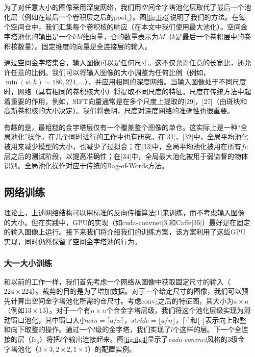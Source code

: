\documentclass[../main.tex]{subfile}
\begin{document}
为了对任意大小的图像采用深度网络，我们用空间金字塔池化层取代了最后一个池化层（例如在最后一个卷积层之后的$\text{pool}_5$）。图\ref{fig:fig3}说明了我们的方法。在每个空间仓中，我们汇集每个卷积核的响应（在本文中我们使用最大池化）。空间金字塔池化的输出是一个$kM$维向量，仓的数量表示为$M$（$k$是最后一个卷积层中的卷积核数量）。固定维度的向量是全连接层的输入。

通过空间金字塔集合，输入图像可以是任何尺寸。这不仅允许任意的长宽比，还允许任意的比例。我们可以将输入图像的大小调整为任何比例（例如，$\min\left(w, h\right) = 180,224,\ldots$），并应用相同的深度网络。当输入图像处于不同尺度时，网络（具有相同的卷积核大小）将提取不同尺度的特征。尺度在传统方法中起着重要的作用，例如，SIFT向量通常是在多个尺度上提取的[29]，[27]（由斑块和高斯卷积核的大小决定）。我们将表明，尺度对深度网络的准确性也很重要。

有趣的是，最粗糙的金字塔层仅有一个覆盖整个图像的单仓。这实际上是一种“全局池化”操作，在几个同时进行的工作中也有研究。在[31]、[32]中，全局平均池化被用来减少模型的大小，也减少了过拟合；在[33]中，全局平均池化被用在所有$fc$层之后的测试阶段，以提高准确性；在[34]中，全局最大池化被用于弱监督的物体识别。全局池化操作对应于传统的Bag-of-Words方法。

\subsection{网络训练}

理论上，上述网络结构可以用标准的反向传播算法[1]来训练，而不考虑输入图像的大小。但在实践中，GPU的实现（如cuda-convnet[3]和Caffe[35]）最好是在固定的输入图像上运行。接下来我们将介绍我们的训练方案，该方案利用了这些GPU实现，同时仍然保留了空间金字塔池的行为。

\subsubsection*{大一大小训练}

和以前的工作一样，我们首先考虑一个网络从图像中获取固定尺寸的输入（$224\times 224$）。裁剪的目的是为了增加数据。对于一个给定尺寸的图像，我们可以预先计算出空间金字塔池化所需的仓尺寸。考虑$\text{conv}_5$之后的特征图，其大小为$a\times a$（例如$13\times 13$）。对于一个有$n\times n$个仓金字塔层级，我们将这个池化层级实现为滑动窗口池化，其中窗口大小$win=\lceil a/n \rceil $，$stride = \lfloor a/n \rfloor$，$\lceil \cdot \rceil $和$\lfloor \cdot \rfloor$表示向上取整和向下取整的操作。通过一个$l$级的金字塔，我们实现了$l$个这样的层。下一个全连接的层（$\text{fc}_6$）将把$l$个输出连接起来。图\ref{fig:fig4}显示了\textit{cuda-convnet}风格\cite{alexnet}的3级金字塔池化（$3\times 3, 2\times 2, 1\times 1$）的配置实例。
\end{document}
